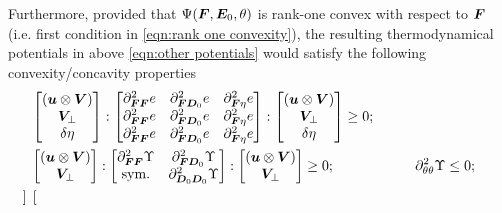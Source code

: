 Furthermore, provided that $\Psi(\boldsymbol{F},\boldsymbol{E}_0,\theta)$ is rank-one convex with respect to $\boldsymbol{F}$ (i.e. first condition in \eqref{eqn:rank one convexity}), the resulting thermodynamical potentials in above \eqref{eqn:other potentials} would satisfy the following convexity/concavity properties
%
\begin{equation}\label{eqn:rank one convexity other potentials}
\begin{aligned}
%	
%
&\begin{bmatrix}
\left(\vect{u}\otimes\vect{V}\right)\\
\vect{V}_{\perp}\\
\delta \eta
\end{bmatrix}:\begin{bmatrix}
\partial^2_{\vect{F}\vect{F}}e  &  \partial^2_{\vect{F}\vect{D}_0}e  &  \partial^2_{\vect{F}\eta}e\\
%
\partial^2_{\vect{F}\vect{F}}e  &  \partial^2_{\vect{F}\vect{D}_0}e  &  \partial^2_{\vect{F}\eta}e\\
%
\partial^2_{\vect{F}\vect{F}}e  &  \partial^2_{\vect{F}\vect{D}_0}e  &  \partial^2_{\vect{F}\eta}e
\end{bmatrix}:\begin{bmatrix}
\left(\vect{u}\otimes\vect{V}\right)\\
\vect{V}_{\perp}\\
\delta \eta
\end{bmatrix}
\geq 0;&\\
%
%
%
%
&\begin{bmatrix}
\left(\vect{u}\otimes\vect{V}\right)\\
\vect{V}_{\perp}
\end{bmatrix}:\begin{bmatrix}
\partial^2_{\vect{F}\vect{F}}\Upsilon  &  \partial^2_{\vect{F}\vect{D}_0}\Upsilon  \\
%
\text{sym.}  &  \partial^2_{\vect{D}_0\vect{D}_0}\Upsilon\\
\end{bmatrix}:\begin{bmatrix}
\left(\vect{u}\otimes\vect{V}\right)\\
\vect{V}_{\perp}
\end{bmatrix}
\geq 0;&\qquad
%
%
&\partial^2_{\theta\theta}\Upsilon\leq 0;\\
%
%
%
%
&\begin{bmatrix}

\end{bmatrix}
\end{aligned}
\end{equation}
